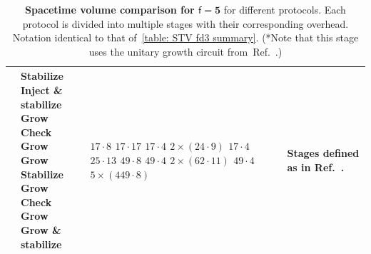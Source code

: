 \documentclass[%
    aps, 
    physrev,
    reprint,
]{revtex4-2}
\newcommand{\fd}[1]{\mathsf{f}=#1}
\begin{document}
\begin{table}
\begin{tabular}{|c|l|l|l|}
    \cite{vaknin2025magic} & 
    \makecell[l]{Stabilize \\
                Inject \& stabilize \\
                Grow \\
                Check \\
                Grow \\
                Grow \\
                Stabilize \\
                Grow \\
                Check \\
                Grow \\
                Grow \& stabilize
                } &
    \makecell[l]{$17 \cdot 8$ \\
                $17 \cdot 17$ \\
                $17 \cdot 4$ \\
                $2\times (24 \cdot 9)$ \\
                $17 \cdot 4$ \\
                $25 \cdot 13$ \\
                $49 \cdot 8$ \\
                $49 \cdot 4$ \\
                $2\times (62 \cdot 11)$ \\
                $49 \cdot 4$ \\
                $5\times (449 \cdot 8)$
                } &
    Stages defined as in Ref.~\cite{vaknin2025magic}.\\ \hline  
    \end{tabular}
    \caption{
    {\textbf{Spacetime volume comparison for $\boldsymbol{\fd5}$} for different protocols.} 
    Each protocol is divided into multiple stages with their corresponding overhead. 
    Notation identical to that of~\cref{table: STV fd3 summary}.
    (*Note that this stage uses the unitary growth circuit from~Ref.~\cite{claes2025lowerdepthlocalencodingcircuits}.)}
    \label{table: STV fd5 summary}
\end{table}
\end{document}
